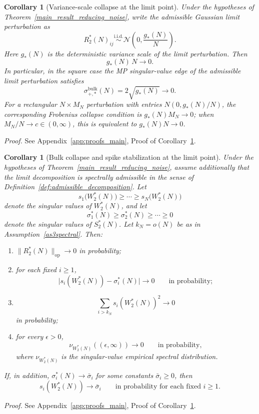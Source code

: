 \documentclass[11pt]{article}
\theoremstyle{plain}
\newtheorem{cor}[thm]{Corollary}
\theoremstyle{definition}
\theoremstyle{remark}
\newcommand{\op}{\mathrm{op}}
\newcommand{\1}{\mathbf{1}}
\newcommand{\proofloc}[1]{\par\noindent\emph{Proof.} #1\par}
\begin{document}
\begin{cor}[Variance-scale collapse at the limit point]
\label{cor:variance_scale_collapse}
Under the hypotheses of Theorem~\ref{main_result_reducing_noise}, write the admissible Gaussian limit perturbation as
\[
R_2^*(N)_{ij}\overset{\mathrm{i.i.d.}}{\sim}
\mathcal N\!\left(0,\frac{g_*(N)}{N}\right).
\]
Here \(g_*(N)\) is the deterministic variance scale of the limit perturbation.
Then
\[
g_*(N)\,N\to 0.
\]
In particular, in the square case the MP singular-value edge of the admissible limit perturbation satisfies
\[
\sigma_{+,*}^{\mathrm{bulk}}(N)=2\sqrt{g_*(N)}\to 0.
\]
For a rectangular \(N\times M_N\) perturbation with entries \(N(0,g_*(N)/N)\), the corresponding Frobenius collapse condition is \(g_*(N)M_N\to0\); when \(M_N/N\to c\in(0,\infty)\), this is equivalent to \(g_*(N)N\to0\).
\end{cor}
\proofloc{See Appendix~\ref{app:proofs_main}, Proof of Corollary~\ref{cor:variance_scale_collapse}.}

\begin{cor}[Bulk collapse and spike stabilization at the limit point]
\label{cor:bulk_collapse_spike_stabilization}
Under the hypotheses of Theorem~\ref{main_result_reducing_noise}, assume additionally that the limit decomposition is spectrally admissible in the sense of Definition~\ref{def:admissible_decomposition}. Let
\[
s_1\big(W_2^*(N)\big)\ge \cdots \ge s_N\big(W_2^*(N)\big)
\]
denote the singular values of \(W_2^*(N)\), and let
\[
\sigma_1^*(N)\ge \sigma_2^*(N)\ge \cdots \ge 0
\]
denote the singular values of \(S_2^*(N)\). Let \(k_N=o(N)\) be as in Assumption~\ref{as3spectral}.
Then:
\begin{enumerate}[leftmargin=2em]
\item \(\|R_2^*(N)\|_{\op}\to 0\) in probability;
\item for each fixed \(i\ge1\),
\[
\big|s_i(W_2^*(N))-\sigma_i^*(N)\big|\to 0
\qquad\text{in probability};
\]
\item
\[
\sum_{i>k_N} s_i(W_2^*(N))^2\to 0
\]
in probability;
\item for every \(\epsilon>0\),
\[
\nu_{W_2^*(N)}((\epsilon,\infty))\to 0
\qquad\text{in probability},
\]
where \(\nu_{W_2^*(N)}\) is the singular-value empirical spectral distribution.
\end{enumerate}
If, in addition, \(\sigma_i^*(N)\to \bar\sigma_i\) for some constants \(\bar\sigma_i\ge 0\), then
\[
s_i(W_2^*(N))\to \bar\sigma_i
\qquad\text{in probability for each fixed }i\ge1.
\]
\end{cor}
\proofloc{See Appendix~\ref{app:proofs_main}, Proof of Corollary~\ref{cor:bulk_collapse_spike_stabilization}.}
\end{document}
